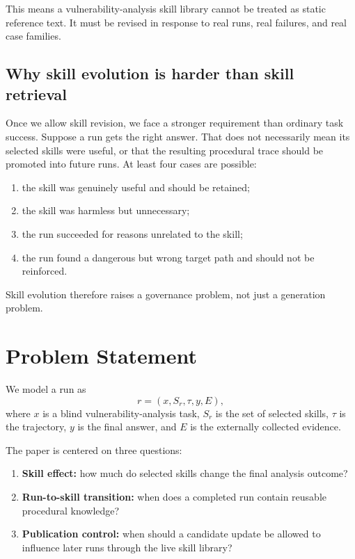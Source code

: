 \documentclass[11pt]{article}
\begin{document}
This means a vulnerability-analysis skill library cannot be treated as static reference
text.  It must be revised in response to real runs, real failures, and real case
families.

\subsection{Why skill evolution is harder than skill retrieval}

Once we allow skill revision, we face a stronger requirement than ordinary task success.
Suppose a run gets the right answer.  That does not necessarily mean its selected skills
were useful, or that the resulting procedural trace should be promoted into future runs.
At least four cases are possible:
\begin{enumerate}[leftmargin=*]
    \item the skill was genuinely useful and should be retained;
    \item the skill was harmless but unnecessary;
    \item the run succeeded for reasons unrelated to the skill;
    \item the run found a dangerous but wrong target path and should not be reinforced.
\end{enumerate}

Skill evolution therefore raises a governance problem, not just a generation problem.

\section{Problem Statement}
\label{sec:problem}

We model a run as
\begin{equation}
    r = (x, S_r, \tau, y, E),
\end{equation}
where $x$ is a blind vulnerability-analysis task, $S_r$ is the set of selected skills,
$\tau$ is the trajectory, $y$ is the final answer, and $E$ is the externally collected
evidence.

The paper is centered on three questions:
\begin{enumerate}[leftmargin=*]
    \item \textbf{Skill effect:} how much do selected skills change the final analysis
    outcome?
    \item \textbf{Run-to-skill transition:} when does a completed run contain reusable
    procedural knowledge?
    \item \textbf{Publication control:} when should a candidate update be allowed to
    influence later runs through the live skill library?
\end{enumerate}
\end{document}
